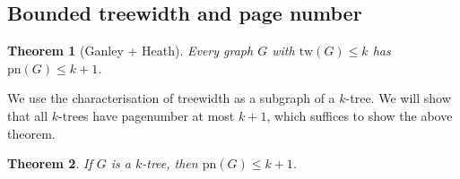 \documentclass[]{report}
\newcommand{\tw}{\text{tw}}
\newcommand{\pn}{\text{pn}}
\newtheorem{theorem}{Theorem}
\theoremstyle{definition}
\numberwithin{theorem}{section}
\numberwithin{equation}{section}
\begin{document}
\subsection{Bounded treewidth and page number}\label{ssec:Bounded_Treewidth}
\begin{theorem}[Ganley + Heath\cite{ganleyPagenumberTrees2001}]\label{thm:bded_treewidth_bded_pagenumber}
	Every graph $G$ with $\tw(G) \leq k$ has $\pn(G) \leq k + 1$. 
\end{theorem}

We use the characterisation of treewidth as a subgraph of a $k$-tree. We will show that all $k$-trees have pagenumber at most $k + 1$, which suffices to show the above theorem.

\begin{theorem}
	If $G$ is a $k$-tree, then $\pn(G) \leq k + 1$. 
\end{theorem}
\end{document}
